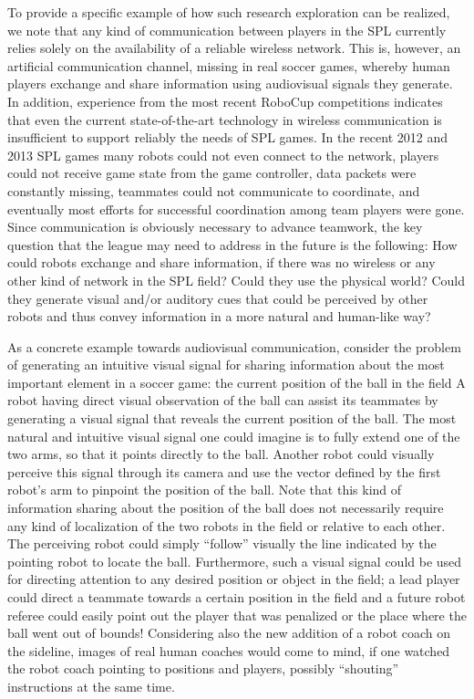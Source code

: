 \documentclass{llncs}
\begin{document}
To provide a specific example of how such research exploration can be realized, we note that 
any kind of communication between players in the SPL currently relies solely on the 
availability of a reliable wireless network. This is, however, an artificial communication 
channel, missing in real soccer games, whereby human players exchange and share information 
using audiovisual signals they generate. 
In addition, experience from the most recent RoboCup competitions indicates that even the 
current state-of-the-art technology in wireless communication is insufficient to support 
reliably the needs of SPL games. In the recent 2012 and 2013 SPL games many robots could not 
even connect to the network, players could not receive game state from the game controller, 
data packets were constantly missing, teammates could not communicate to coordinate, and 
eventually most efforts for successful coordination among team players were gone. Since 
communication is obviously necessary to advance teamwork, the key question that the league 
may need to address in the future is the following: How could robots exchange and share 
information, if there was no wireless or any other kind of network in the SPL field? Could 
they use the physical world? Could they generate visual and/or auditory cues that could be 
perceived by other robots and thus convey information in a more natural and human-like way? 

As a concrete example towards audiovisual communication, consider the problem of generating 
an intuitive visual signal for sharing information about the most important element in a 
soccer game: the current position of the ball in the field
A robot having direct visual observation of the ball can assist its teammates by 
generating a visual signal that reveals the current position of the ball. The most natural 
and intuitive visual signal one could imagine is to fully extend one of the two arms, so that 
it points directly to the ball. Another robot could visually perceive this signal through its 
camera and use the vector defined by the first robot's arm to pinpoint the position of the 
ball. Note that this kind of information sharing about the position of the ball does not 
necessarily require any kind of localization of the two robots in the field or relative to 
each other. The perceiving robot could simply ``follow'' visually the line indicated by the 
pointing robot to locate the ball. Furthermore, such a visual signal could be used for 
directing attention to any desired position or object in the field; a lead player could 
direct a teammate towards a certain position in the field and a future robot referee could 
easily point out the player that was penalized or the place where the ball went out of 
bounds! Considering also the new addition of a robot coach on the sideline, images of real 
human coaches would come to mind, if one watched the robot coach pointing to positions and 
players, possibly ``shouting'' instructions at the same time. 
\end{document}
